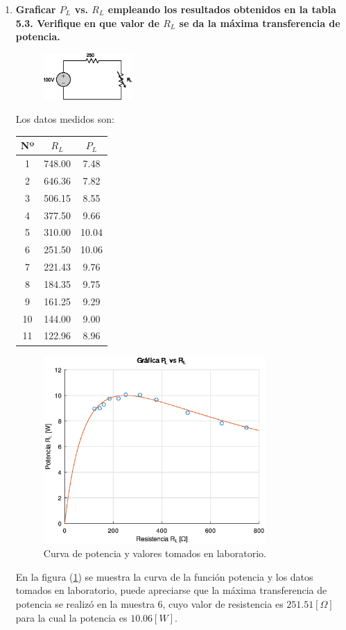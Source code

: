 \documentclass[letter,11pt]{article}
\begin{document}
\begin{enumerate}
\item \textbf{Graficar $P_L$ vs. $R_L$ empleando los resultados obtenidos en la
tabla 5.3. Verifique en que valor de $R_L$ se da la máxima transferencia de
potencia.}\\

\begin{figure}[!h]
\centering
\includegraphics[width=0.32\textwidth]{resources/figura2.eps}
\end{figure}

Los datos medidos son:
\begin{center}
\begin{tabular}{|c|c|c|}
\hline
\textbf{Nº} & $R_L$ & $P_L$ \tabularnewline \hline \hline
 1 & 748.00 &  7.48 \tabularnewline \hline
 2 & 646.36 &  7.82 \tabularnewline \hline
 3 & 506.15 &  8.55 \tabularnewline \hline
 4 & 377.50 &  9.66 \tabularnewline \hline
 5 & 310.00 & 10.04 \tabularnewline \hline
 6 & 251.50 & 10.06 \tabularnewline \hline
 7 & 221.43 &  9.76 \tabularnewline \hline
 8 & 184.35 &  9.75 \tabularnewline \hline
 9 & 161.25 &  9.29 \tabularnewline \hline
10 & 144.00 &  9.00 \tabularnewline \hline
11 & 122.96 &  8.96 \tabularnewline \hline
\end{tabular}
\end{center}

\begin{figure}[!h]
\centering
\includegraphics[width=0.80\textwidth]{resources/o1.eps}
\caption{Curva de potencia y valores tomados en laboratorio.}
\label{plvsrl}
\end{figure}

En la figura (\ref{plvsrl}) se muestra la curva de la función potencia y los
datos tomados en laboratorio, puede apreciarse que la máxima transferencia de
potencia se realizó en la muestra $6$, cuyo valor de resistencia es
$251.51 [\Omega]$ para la cual la potencia es $10.06 [W]$.

\end{enumerate}
\end{document}
